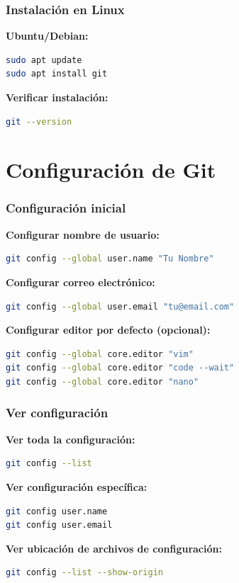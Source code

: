 \documentclass[aspectratio=169]{beamer}
\begin{document}
\begin{frame}[fragile]
\frametitle{Instalación en Linux}
\textbf{Ubuntu/Debian:}
\begin{lstlisting}[language=bash]
sudo apt update
sudo apt install git
\end{lstlisting}

%

\textbf{Verificar instalación:}
\begin{lstlisting}[language=bash]
git --version
\end{lstlisting}
\end{frame}

\section{Configuración de Git}
\begin{frame}[fragile]
\frametitle{Configuración inicial}
\textbf{Configurar nombre de usuario:}
\begin{lstlisting}[language=bash]
git config --global user.name "Tu Nombre"
\end{lstlisting}

\textbf{Configurar correo electrónico:}
\begin{lstlisting}[language=bash]
git config --global user.email "tu@email.com"
\end{lstlisting}

\textbf{Configurar editor por defecto (opcional):}
\begin{lstlisting}[language=bash]
git config --global core.editor "vim"
git config --global core.editor "code --wait"
git config --global core.editor "nano"
\end{lstlisting}
\end{frame}

\begin{frame}[fragile]
\frametitle{Ver configuración}
\textbf{Ver toda la configuración:}
\begin{lstlisting}[language=bash]
git config --list
\end{lstlisting}

\textbf{Ver configuración específica:}
\begin{lstlisting}[language=bash]
git config user.name
git config user.email
\end{lstlisting}

\textbf{Ver ubicación de archivos de configuración:}
\begin{lstlisting}[language=bash]
git config --list --show-origin
\end{lstlisting}
\end{frame}
\end{document}
